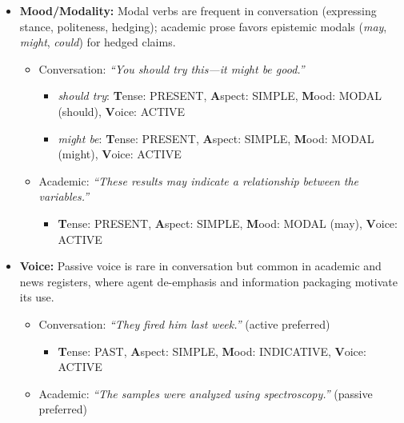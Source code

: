 \documentclass[11pt]{article}
\begin{document}
\begin{itemize}
\begin{itemize}
      \item News: \emph{``The committee has voted to approve the measure.''}
      \begin{itemize}
        \item \textbf{T}ense: PRESENT, \textbf{A}spect: PERFECT, \textbf{M}ood: INDICATIVE, \textbf{V}oice: ACTIVE
      \end{itemize}
    \end{itemize}
  \item \textbf{Mood/Modality:} Modal verbs are frequent in conversation (expressing stance, politeness, hedging); academic prose favors epistemic modals (\emph{may}, \emph{might}, \emph{could}) for hedged claims. \citep{Biber20101999LongmanEnglish}
    \begin{itemize}
      \item Conversation: \emph{``You should try this---it might be good.''}
      \begin{itemize}
        \item \emph{should try}: \textbf{T}ense: PRESENT, \textbf{A}spect: SIMPLE, \textbf{M}ood: MODAL (should), \textbf{V}oice: ACTIVE
        \item \emph{might be}: \textbf{T}ense: PRESENT, \textbf{A}spect: SIMPLE, \textbf{M}ood: MODAL (might), \textbf{V}oice: ACTIVE
      \end{itemize}
      \item Academic: \emph{``These results may indicate a relationship between the variables.''}
      \begin{itemize}
        \item \textbf{T}ense: PRESENT, \textbf{A}spect: SIMPLE, \textbf{M}ood: MODAL (may), \textbf{V}oice: ACTIVE
      \end{itemize}
    \end{itemize}
  \item \textbf{Voice:} Passive voice is rare in conversation but common in academic and news registers, where agent de-emphasis and information packaging motivate its use. \citep{Biber20101999LongmanEnglish}
    \begin{itemize}
      \item Conversation: \emph{``They fired him last week.''} (active preferred)
      \begin{itemize}
        \item \textbf{T}ense: PAST, \textbf{A}spect: SIMPLE, \textbf{M}ood: INDICATIVE, \textbf{V}oice: ACTIVE
      \end{itemize}
      \item Academic: \emph{``The samples were analyzed using spectroscopy.''} (passive preferred)

\end{itemize}
\end{itemize}
\end{document}
